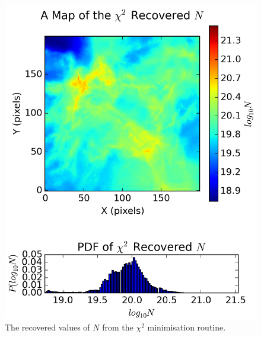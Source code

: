 \documentclass{report}
\begin{document}
\begin{figure}[H]
  \captionsetup{width=0.2\textwidth}
  \begin{minipage}[b]{0.25\linewidth}
    \centering
    \includegraphics[width=\linewidth]{../img/sph/map_N_chi.png}
    \caption{\protect The recovered values of $N$ from the $\chi^{2}$ minimisation routine.}\label{fig:map_N_chi_sph}
    \vspace{4ex}
  \end{minipage}%
  \begin{minipage}[b]{0.25\linewidth}
    \centering

\end{minipage}
\end{figure}
\end{document}
